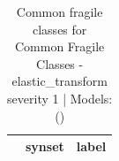 \begin{table}
\caption{Common fragile classes for Common Fragile Classes - elastic_transform severity 1 | Models: ()}
\label{tab:Common Fragile Classes - elastic_transform severity 1_d41d8cd9}
\begin{tabular}{cll}
\toprule
 & synset & label \\
\midrule
\bottomrule
\end{tabular}
\end{table}
